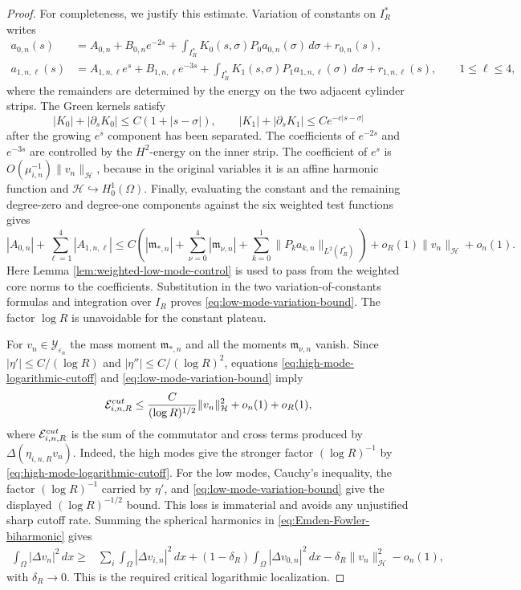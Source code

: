 \documentclass[10pt,a4paper]{amsart}
\begin{document}
\begin{proof}
For completeness, we justify this estimate.  Variation of constants
on $I_R^*$ writes
\[
\begin{aligned}
a_{0,n}(s)
&=A_{0,n}+B_{0,n}e^{-2s}
+\int_{I_R^*}K_0(s,\sigma)P_0a_{0,n}(\sigma)\,d\sigma+r_{0,n}(s),\\
a_{1,n,\ell}(s)
&=A_{1,n,\ell}e^s+B_{1,n,\ell}e^{-3s}
+\int_{I_R^*}K_1(s,\sigma)P_1a_{1,n,\ell}(\sigma)\,d\sigma
+r_{1,n,\ell}(s),
\qquad 1\leq\ell\leq4,
\end{aligned}
\]
where the remainders are determined by the energy on the two
adjacent cylinder strips.  The Green kernels satisfy
\[
|K_0|+|\partial_sK_0|\leq C(1+|s-\sigma|),
\qquad
|K_1|+|\partial_sK_1|
\leq Ce^{-c|s-\sigma|}
\]
after the growing $e^s$ component has been separated.  The
coefficients of $e^{-2s}$ and $e^{-3s}$ are controlled by the
$H^2$-energy on the inner strip.  The coefficient of $e^s$ is
$O(\mu_{i,n}^{-1})\|v_n\|_{\mathcal H}$, because in the original
variables it is an affine harmonic function and
$\mathcal H\hookrightarrow H_0^1(\Omega)$.  Finally, evaluating the
constant and the remaining degree-zero and degree-one components
against the six weighted test functions gives
\[
|A_{0,n}|+\sum_{\ell=1}^4|A_{1,n,\ell}|
\leq C\left(
|\mathfrak m_{*,n}|+\sum_{\nu=0}^4|\mathfrak m_{\nu,n}|
+\sum_{k=0}^1\|P_ka_{k,n}\|_{L^2(I_R^*)}\right)
+o_R(1)\|v_n\|_{\mathcal H}+o_n(1).
\]
Here Lemma \ref{lem:weighted-low-mode-control} is used to pass from
the weighted core norms to the coefficients.  Substitution in the
two variation-of-constants formulas and integration over $I_R$
proves \eqref{eq:low-mode-variation-bound}.  The factor $\log R$ is
unavoidable for the constant plateau.

For $v_n\in\mathcal Y_{\varepsilon_n}$ the mass moment
$\mathfrak m_{*,n}$ and all the moments $\mathfrak m_{\nu,n}$ vanish. Since
$|\eta'|\leq C/(\log R)$ and
$|\eta''|\leq C/(\log R)^2$, equations
\eqref{eq:high-mode-logarithmic-cutoff} and
\eqref{eq:low-mode-variation-bound} imply
\begin{equation}\label{eq:cylindrical-transition-control}
\mathcal E_{i,n,R}^{\rm cut}
\leq
\frac{C}{(\log R)^{1/2}}\|v_n\|_{\mathcal H}^2
+o_n(1)+o_R(1),
\end{equation}
where $\mathcal E_{i,n,R}^{\rm cut}$ is the sum of the commutator
and cross terms produced by $\Delta(\eta_{i,n,R}v_n)$.  Indeed, the
high modes give the stronger factor $(\log R)^{-1}$ by
\eqref{eq:high-mode-logarithmic-cutoff}.  For the low modes,
Cauchy's inequality, the factor $(\log R)^{-1}$ carried by
$\eta'$, and \eqref{eq:low-mode-variation-bound} give the displayed
$(\log R)^{-1/2}$ bound.  This loss is immaterial and avoids any
unjustified sharp cutoff rate.
Summing the spherical harmonics in
\eqref{eq:Emden-Fowler-biharmonic} gives
\begin{equation}\label{eq:quadratic-local-energy}
\begin{aligned}
\int_\Omega|\Delta v_n|^2\,dx
\geq{}&
\sum_i\int_\Omega|\Delta v_{i,n}|^2\,dx
+(1-\delta_R)\int_\Omega|\Delta v_{0,n}|^2\,dx -\delta_R\|v_n\|_{\mathcal H}^2-o_n(1),
\end{aligned}
\end{equation}
with $\delta_R\to0$. This is the required critical logarithmic
localization.


\end{proof}
\end{document}
